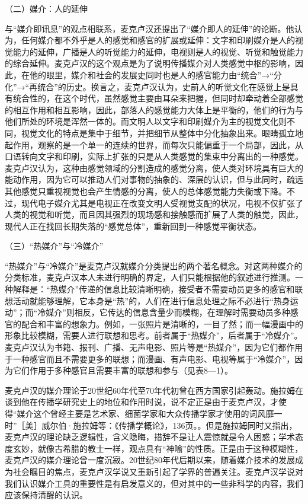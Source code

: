 \documentclass[UTF8,12pt]{ctexart}
\numberwithin{equation}{section} %
\numberwithin{figure}{section}
\numberwithin{table}{section}
\begin{document}
	（二）媒介：人的延伸
	
	与“媒介即讯息”的观点相联系，麦克卢汉还提出了“媒介即人的延伸”的论断。他认为，任何媒介都不外乎是人的感觉和感官的扩展或延伸：文字和印刷媒介是人的视觉能力的延伸，广播是人的听觉能力的延伸，电视则是人的视觉、听觉和触觉能力的综合延伸。麦克卢汉的这个观点是为了说明传播媒介对人类感觉中枢的影响，因此，在他的眼里，媒介和社会的发展史同时也是人的感官能力由“统合”→“分化”→“再统合”的历史。换言之，麦克卢汉认为，史前人的听觉文化在感觉上是具有统合性的，在这个时代，虽然感觉主要由耳朵来把握，但同时却牵动着全部感觉的相互作用和相互影响，因此，部落人的感觉能力大体上是平衡的，他们的行为与他们所处的环境是浑然一体的。而文明人以文字和印刷媒介为主的视觉文化则不同，视觉文化的特点是集中于细节，并把细节从整体中分化抽象出来。眼睛孤立地起作用，观察的是一个单一的连续的世界，而每次只能偏重于一个局部，因此，从口语转向文字和印刷，实际上扩张的只是从人类感觉的集束中分离出的一种感觉。麦克卢汉认为，这种由感觉领域的分割造成的感觉分离，使人类对环境具有巨大的能动作用，因为它可以推动人们对事物的抽象的、深层的认识，但与此同时，疏远其他感觉只重视视觉也会产生情感的分离，使人的总体感觉能力失衡或下降。不过，现代电子媒介尤其是电视正在改变文明人受视觉支配的状况，电视不仅扩张了人类的视觉和听觉，而且因其强烈的现场感和接触感而扩展了人类的触觉，因此，现代人正在找回长期失落的“感觉总体”，重新回到一种感觉平衡状态。
	
	（三）“热媒介”与“冷媒介”
	
	“热媒介”与“冷媒介”是麦克卢汉就媒介分类提出的两个著名概念。对这两种媒介的分类标准，麦克卢汉本人未进行明确的界定，人们只能根据他的叙述进行推测。一种解释是：“热媒介”传递的信息比较清晰明确，接受者不需要动员更多的感官和联想活动就能够理解，它本身是“热”的，人们在进行信息处理之际不必进行“热身运动”；而“冷媒介”则相反，它传达的信息含量少而模糊，在理解时需要动员多种感官的配合和丰富的想象力。例如，一张照片是清晰的，一目了然；而一幅漫画中的形象比较模糊，需要人进行联想和思考。前者属于“热媒介”，后者属于“冷媒介”。麦克卢汉认为书籍、报刊、广播、无声电影、照片等是“热媒介”，因为它们都作用于一种感官而且不需要更多的联想；而漫画、有声电影、电视等属于“冷媒介”，因为它们作用于多种感官且需要丰富的联想和参与（见表8—1）。
	
	麦克卢汉的媒介理论于20世纪60年代至70年代初曾在西方国家引起轰动。施拉姆在谈到他在传播学研究史上的地位和作用时说，说不定正是由于麦克卢汉，才使得“媒介这个曾经主要是艺术家、细菌学家和大众传播学家才使用的词风靡一时”［美］威尔伯·施拉姆等：《传播学概论》，136页。。但是施拉姆同时又指出，麦克卢汉的理论缺乏逻辑性，含义隐晦，措辞不是让人震惊就是令人困惑；学术态度玄妙，就像古希腊的教士一样，观点具有“神喻”的性质。正是由于这种模糊性，麦克卢汉的媒介理论曾一度沉寂。20世纪80年代后期以来，随着媒介技术的发展成为社会瞩目的焦点，麦克卢汉学说又重新引起了学界的普遍关注。麦克卢汉学说对我们认识媒介工具的重要性是有启发意义的，但对其中的一些非科学的内容，我们应该保持清醒的认识。
	
\end{document}

